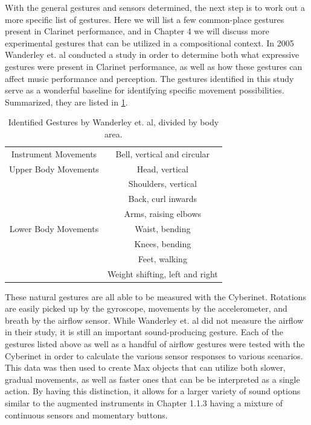 With the general gestures and sensors determined, the next step is to work out a more specific list of gestures. Here we will list a few common-place gestures present in Clarinet performance, and in Chapter 4 we will discuss more experimental gestures that can be utilized in a compositional context. In 2005 Wanderley et. al conducted a study in order to determine both what expressive gestures were present in Clarinet performance, as well as how these gestures can affect music performance and perception\cite{wanderleyClarinetGesture2005}. The gestures identified in this study serve as a wonderful baseline for identifying specific movement possibilities. Summarized, they are listed in \ref{tab:generalGestures}.

\begin{table}[]
    \centering
    \begin{tabular}{c|c}
       Instrument Movements  & Bell, vertical and circular \\
        Upper Body Movements & Head, vertical \\
        & Shoulders, vertical \\
        & Back, curl inwards \\
        & Arms, raising elbows \\
        Lower Body Movements & Waist, bending \\
        & Knees, bending \\
        & Feet, walking \\
        & Weight shifting, left and right
    \end{tabular}
    \caption{Identified Gestures by Wanderley et. al\cite{wanderleyClarinetGesture2005}, divided by body area.}
    \label{tab:generalGestures}
\end{table}

These natural gestures are all able to be measured with the Cyberinet. Rotations are easily picked up by the gyroscope, movements by the accelerometer, and breath by the airflow sensor. While Wanderley et. al did not measure the airflow in their study, it is still an important sound-producing gesture\cite{miranda_Wanderley_instrumentControl_2006}. Each of the gestures listed above as well as a handful of airflow gestures were tested with the Cyberinet in order to calculate the various sensor responses to various scenarios. This data was then used to create Max objects that can utilize both slower, gradual movements, as well as faster ones that can be be interpreted as a single action. By having this distinction, it allows for a larger variety of sound options similar to the augmented instruments in Chapter 1.1.3 having a mixture of continuous sensors and momentary buttons.

